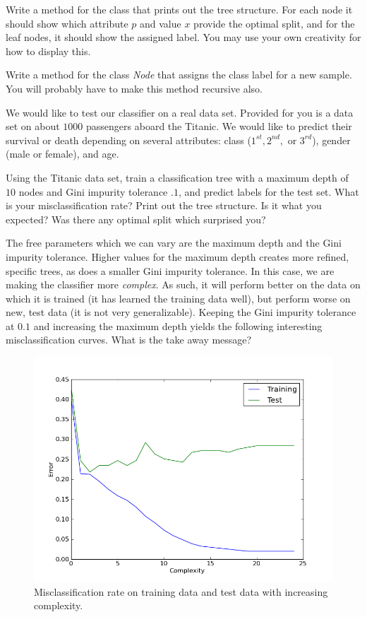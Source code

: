 \begin{problem}
Write a method for the class  that prints out the tree structure. For each node it should show which attribute $p$ and value $x$ provide the optimal split, and for the leaf nodes, it should show the assigned label. You may use your own creativity for how to display this.
\end{problem}

\begin{problem}
Write a method for the class \emph{Node} that assigns the class label for a new sample. You will probably have to make this method recursive also.
\end{problem}

We would like to test our classifier on a real data set. Provided for you is a data set on about $1000$ passengers aboard the Titanic. We would like to predict their survival or death depending on several attributes: class ($1^{st}, 2^{nd},$ or $3^{rd}$), gender (male or female), and age.

\begin{problem}
Using the Titanic data set, train a classification tree with a maximum depth of $10$ nodes and Gini impurity tolerance $.1$, and predict labels for the test set. What is your misclassification rate? Print out the tree structure. Is it what you expected? Was there any optimal split which surprised you?
\end{problem}

The free parameters which we can vary are the maximum depth and the Gini impurity tolerance. Higher values for the maximum depth creates more refined, specific trees, as does a smaller Gini impurity tolerance. In this case, we are making the classifier more \emph{complex}. As such, it will perform better on the data on which it is trained (it has learned the training data well), but perform worse on new, test data (it is not very generalizable). Keeping the Gini impurity tolerance at $0.1$ and increasing the maximum depth yields the following interesting misclassification curves. What is the take away message?

\begin{figure}
\centering
\includegraphics[width=\textwidth]{complexity.png}
\caption{Misclassification rate on training data and test data with increasing complexity.}
\end{figure}
